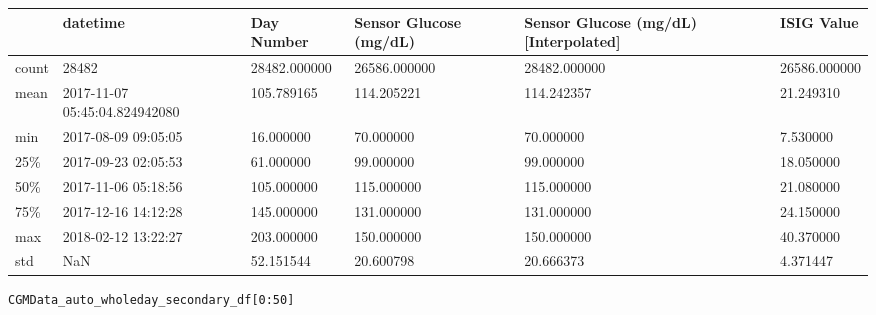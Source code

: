 \bigskip\noindent
\begin{tabular}{p{}p{}p{}p{}p{}p{}}
\toprule
 & datetime & Day Number & Sensor Glucose (mg/dL) & Sensor Glucose (mg/dL) [Interpolated] & ISIG Value \\
\hline
count & 28482 & 28482.000000 & 26586.000000 & 28482.000000 & 26586.000000 \\
\hline
mean & 2017-11-07 05:45:04.824942080 & 105.789165 & 114.205221 & 114.242357 & 21.249310 \\
\hline
min & 2017-08-09 09:05:05 & 16.000000 & 70.000000 & 70.000000 & 7.530000 \\
\hline
25\% & 2017-09-23 02:05:53 & 61.000000 & 99.000000 & 99.000000 & 18.050000 \\
\hline
50\% & 2017-11-06 05:18:56 & 105.000000 & 115.000000 & 115.000000 & 21.080000 \\
\hline
75\% & 2017-12-16 14:12:28 & 145.000000 & 131.000000 & 131.000000 & 24.150000 \\
\hline
max & 2018-02-12 13:22:27 & 203.000000 & 150.000000 & 150.000000 & 40.370000 \\
\hline
std & NaN & 52.151544 & 20.600798 & 20.666373 & 4.371447 \\
\hline
\bottomrule
\end{tabular}

\bigskip

\begin{verbatim}
CGMData_auto_wholeday_secondary_df[0:50]
\end{verbatim}

